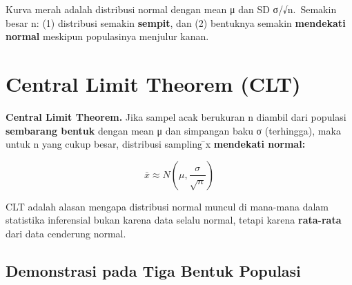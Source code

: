 \documentclass[
  indonesian,
  letterpaper,
]{book}
\begin{document}
Kurva merah adalah distribusi normal dengan mean μ dan SD σ/√n.~Semakin
besar n: (1) distribusi semakin \textbf{sempit}, dan (2) bentuknya
semakin \textbf{mendekati normal} meskipun populasinya menjulur kanan.

\section{Central Limit Theorem (CLT)}\label{central-limit-theorem-clt}

\textbf{Central Limit Theorem.} Jika sampel acak berukuran n diambil
dari populasi \textbf{sembarang bentuk} dengan mean μ dan simpangan baku
σ (terhingga), maka untuk n yang cukup besar, distribusi sampling ̄x
\textbf{mendekati normal:}

\[\bar{x} \approx N\left(\mu, \frac{\sigma}{\sqrt{n}}\right)\]

CLT adalah alasan mengapa distribusi normal muncul di mana-mana dalam
statistika inferensial bukan karena data selalu normal, tetapi karena
\textbf{rata-rata} dari data cenderung normal.

\subsection{Demonstrasi pada Tiga Bentuk
Populasi}\label{demonstrasi-pada-tiga-bentuk-populasi}
\end{document}
